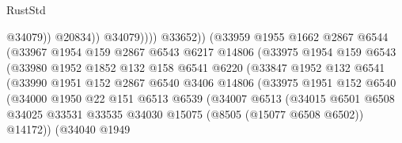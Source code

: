 \begin{lexlean}{RustStd}
\begin{coremodule}
                                            @34079))
                                        @20834))
                                    @34079))))
                            @33652))
                        (@33959
                          @1955
                          @1662
                          @2867
                          @6544
                          (@33967
                            @1954
                            @159
                            @2867
                            @6543
                            @6217
                            @14806
                            (@33975
                              @1954
                              @159
                              @6543
                              (@33980
                                @1952
                                @1852
                                @132
                                @158
                                @6541
                                @6220
                                (@33847
                                  @1952
                                  @132
                                  @6541
                                  (@33990
                                    @1951
                                    @152
                                    @2867
                                    @6540
                                    @3406
                                    @14806
                                    (@33975
                                      @1951
                                      @152
                                      @6540
                                      (@34000
                                        @1950
                                        @22
                                        @151
                                        @6513
                                        @6539
                                        (@34007
                                          @6513
                                          (@34015
                                            @6501
                                            @6508
                                            @34025
                                            @33531
                                            @33535
                                            @34030
                                            @15075
                                            (@8505 (@15077 @6508 @6502))
                                            @14172))
                                        (@34040
                                          @1949

\end{coremodule}
\end{lexlean}
